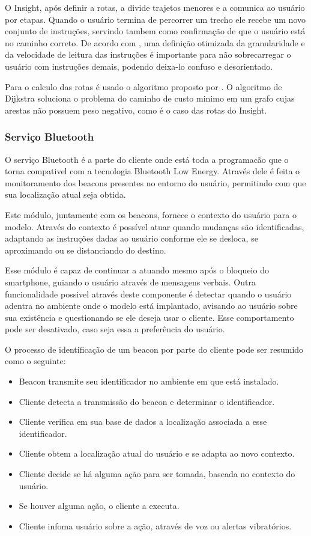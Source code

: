 \documentclass[english,brazilian]{UNISINOSmonografia}
\begin{document}
O Insight, após definir a rotas, a divide trajetos menores e a comunica ao usuário por etapas. Quando o usuário termina de percorrer um trecho ele recebe um novo conjunto de instruções, servindo tambem como confirmação de que o usuário está no caminho correto. De acordo com , uma definição otimizada da granularidade e da velocidade de leitura das instruções é importante para não sobrecarregar o usuário com instruções demais, podendo deixa-lo confuso e desorientado. 

Para o calculo das rotas é usado o algoritmo proposto por . O algoritmo de Dijkstra soluciona o problema do caminho de custo minimo em um grafo cujas arestas não possuem peso negativo, como é o caso das rotas do Insight.

	\subsubsection{Serviço Bluetooth}
O serviço Bluetooth é a parte do cliente onde está toda a programacão que o torna compativel com a tecnologia Bluetooth Low Energy. Através dele é feita o monitoramento dos beacons presentes no entorno do usuário, permitindo com que sua localização atual seja obtida.

Este módulo, juntamente com os beacons, fornece o contexto do usuário para o modelo. Através do contexto é possível atuar quando mudanças são identificadas, adaptando as instruções dadas ao usuário conforme ele se desloca, se aproximando ou se distanciando do destino.

Esse módulo é capaz de continuar a atuando mesmo após o bloqueio do smartphone, guiando o usuário através de mensagens verbais. Outra funcionalidade possivel através deste componente é detectar quando o usuário adentra no ambiente onde o modelo está implantado, avisando ao usuário sobre sua existência e questionando se ele deseja usar o cliente. Esse comportamento pode ser desativado, caso seja essa a preferência do usuário.

O processo de identificação de um beacon por parte do cliente pode ser resumido como o seguinte:
\begin{itemize}
	\item Beacon transmite seu identificador no ambiente em que está instalado. 
	\item Cliente detecta a transmissão do beacon e determinar o identificador.
	\item Cliente verifica em sua base de dados a localização associada a esse identificador.
	\item Cliente obtem a localização atual do usuário e se adapta ao novo contexto.
	\item Cliente decide se há alguma ação para ser tomada, baseada no contexto do usuário.
	\item Se houver alguma ação, o cliente a executa.
	\item Cliente infoma usuário sobre a ação, através de voz ou alertas vibratórios.
\end{itemize}
\end{document}
